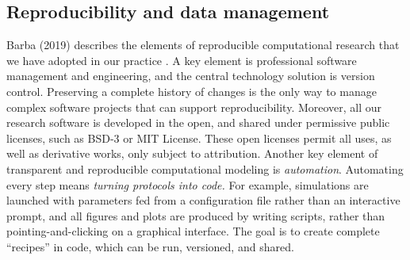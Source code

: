  
 \subsection{Reproducibility and data management} \label{sec:reprod}
 
 Barba (2019) describes the elements of reproducible computational research that we have adopted in our practice \cite{barba2019praxis}. 
 A key element is professional software management and engineering, and the central technology solution is version control. 
 Preserving a complete history of changes is the only way to manage complex software projects that can support reproducibility. 
 Moreover, all our research software is developed in the open, and shared under permissive public licenses, such as BSD-3 or MIT License. 
 These open licenses permit all uses, as well as derivative works, only subject to attribution.
 Another key element of transparent and reproducible computational modeling is \emph{automation}.
Automating every step means \emph{turning protocols into code.}
For example, simulations are launched with parameters fed from a configuration file rather than an interactive prompt, and all figures and plots are produced by writing scripts, rather than pointing-and-clicking on a graphical interface. 
The goal is to create complete ``recipes'' in code, which can be run, versioned, and shared. 

